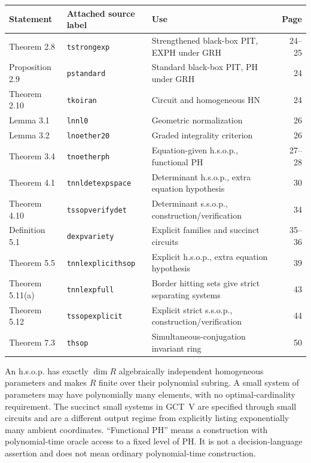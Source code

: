 \documentclass[11pt,a4paper]{article}
\begin{document}
\begin{center}
\small
\begin{tabular}{@{}p{.14\linewidth}p{.25\linewidth}p{.43\linewidth}r@{}}
\hline
Statement & Attached source label & Use & Page \\
\hline
Theorem 2.8 & \texttt{tstrongexp} & Strengthened black-box PIT, EXPH under GRH & 24--25 \\
Proposition 2.9 & \texttt{pstandard} & Standard black-box PIT, PH under GRH & 24 \\
Theorem 2.10 & \texttt{tkoiran} & Circuit and homogeneous HN & 24 \\
Lemma 3.1 & \texttt{lnnl0} & Geometric normalization & 26 \\
Lemma 3.2 & \texttt{lnoether20} & Graded integrality criterion & 26 \\
Theorem 3.4 & \texttt{tnoetherph} & Equation-given h.s.o.p., functional PH & 27--28 \\
Theorem 4.1 & \texttt{tnnldetexpspace} & Determinant h.s.o.p., extra equation hypothesis & 30 \\
Theorem 4.10 & \texttt{tssopverifydet} & Determinant s.s.o.p., construction/verification & 34 \\
Definition 5.1 & \texttt{dexpvariety} & Explicit families and succinct circuits & 35--36 \\
Theorem 5.5 & \texttt{tnnlexplicithsop} & Explicit h.s.o.p., extra equation hypothesis & 39 \\
Theorem 5.11(a) & \texttt{tnnlexpfull} & Border hitting sets give strict separating systems & 43 \\
Theorem 5.12 & \texttt{tssopexplicit} & Explicit strict s.s.o.p., construction/verification & 44 \\
Theorem 7.3 & \texttt{thsop} & Simultaneous-conjugation invariant ring & 50 \\
\hline
\end{tabular}
\end{center}

An h.s.o.p. has exactly $\dim R$ algebraically independent homogeneous
parameters and makes $R$ finite over their polynomial subring. A small
system of parameters may have polynomially many elements, with no
optimal-cardinality requirement. The succinct small systems in GCT~V
are specified through small circuits and are a different output regime
from explicitly listing exponentially many ambient coordinates.
``Functional PH'' means a construction with polynomial-time oracle
access to a fixed level of PH. It is not a decision-language assertion
and does not mean ordinary polynomial-time construction.
\end{document}

